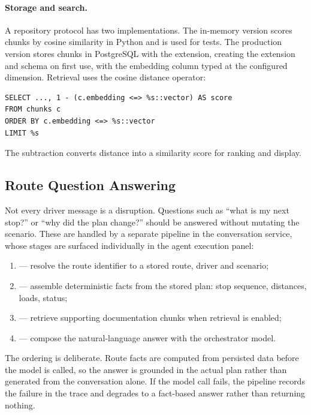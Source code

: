 \documentclass[11pt,a4paper]{article}
\begin{document}
\paragraph{Storage and search.}
A repository protocol has two implementations. The in-memory version scores chunks by cosine
similarity in Python and is used for tests. The production version stores chunks in PostgreSQL with
the  extension, creating the extension and schema on first use, with the embedding
column typed  at the configured dimension. Retrieval uses the cosine distance
operator:

\begin{verbatim}
SELECT ..., 1 - (c.embedding <=> %s::vector) AS score
FROM chunks c
ORDER BY c.embedding <=> %s::vector
LIMIT %s
\end{verbatim}

The subtraction converts distance into a similarity score for ranking and display.

\subsection{Route Question Answering}

Not every driver message is a disruption. Questions such as ``what is my next stop?'' or ``why did
the plan change?'' should be answered without mutating the scenario. These are handled by a separate
pipeline in the conversation service, whose stages are surfaced individually in the agent execution
panel:

\begin{enumerate}
  \item {} --- resolve the route identifier to a stored route, driver and scenario;
  \item {} --- assemble deterministic facts from the stored plan: stop
        sequence, distances, loads, status;
  \item {} --- retrieve supporting documentation chunks when retrieval is enabled;
  \item {} --- compose the natural-language answer with the orchestrator model.
\end{enumerate}

The ordering is deliberate. Route facts are computed from persisted data before the model is called,
so the answer is grounded in the actual plan rather than generated from the conversation alone. If
the model call fails, the pipeline records the failure in the trace and degrades to a fact-based
answer rather than returning nothing.
\end{document}
